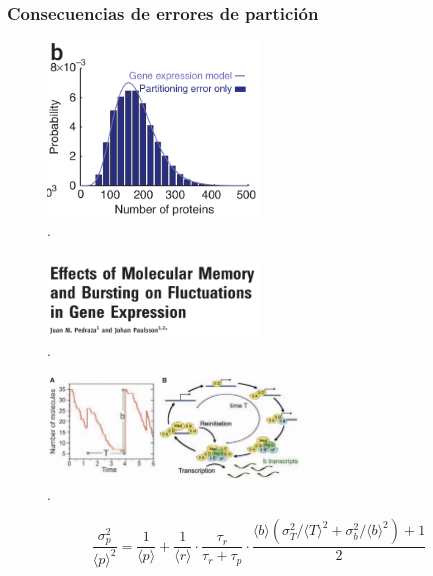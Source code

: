 \documentclass[xcolor=dvipsnames]{beamer}
\begin{document}
\begin{frame}
\frametitle{Consecuencias de errores de partici\'on}

\begin{figure}[p]
    \centering
    \includegraphics[width=0.5\textwidth]{fitting.png}\\
    \tiny \cite{huh11a}.
\end{figure}
\end{frame}


\begin{frame}
\frametitle{}
\begin{figure}[p]
    \centering
    \includegraphics[width=0.5\textwidth]{pedraza08.png}\\
    \tiny \cite{pedraza08}.
\end{figure}

\begin{figure}[p]
    \centering
    \includegraphics[width=0.6\textwidth]{bursting.png}\\
    \tiny \cite{pedraza08}.
\end{figure}
$$\frac{\sigma_p^2}{\langle p \rangle^2} = \frac{1}{\langle p \rangle} + \frac{1}{\langle r \rangle} \cdot \frac{\tau_r}{\tau_r + \tau_p} \cdot \frac{\langle b \rangle (\sigma_T^2/\langle T \rangle^2 + \sigma_b^2/\langle b \rangle^2) + 1}{2}$$
\end{frame}
\end{document}

